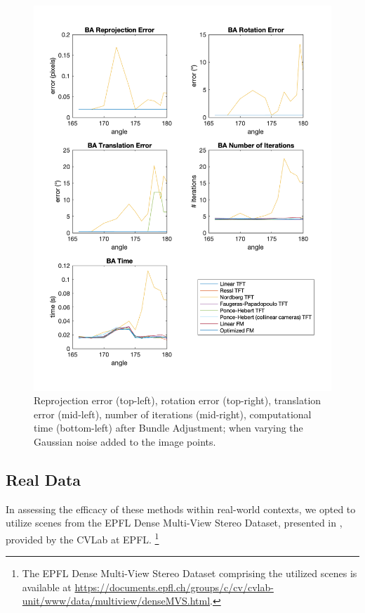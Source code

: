 \begin{figure}[p]
	\centering
	\includegraphics[width=1\textwidth]{Experiments/Synthetic/angle/BAanglePlots.png}
	\caption{Reprojection error (top-left), rotation error (top-right), translation error (mid-left), number of iterations (mid-right), computational time (bottom-left) after Bundle Adjustment; when varying the Gaussian noise added to the image points.}
\end{figure}

\pagebreak

\subsection{Real Data}
In assessing the efficacy of these methods within real-world contexts, we opted to utilize scenes from the EPFL Dense Multi-View Stereo Dataset, presented in \cite{13-epfl-dataset}, provided by the CVLab at EPFL. \footnote{The EPFL Dense Multi-View Stereo Dataset comprising the utilized scenes is available at \href{https://documents.epfl.ch/groups/c/cv/cvlab-unit/www/data/multiview/denseMVS.html}{https://documents.epfl.ch/groups/c/cv/cvlab-unit/www/data/multiview/denseMVS.html}.}\\



